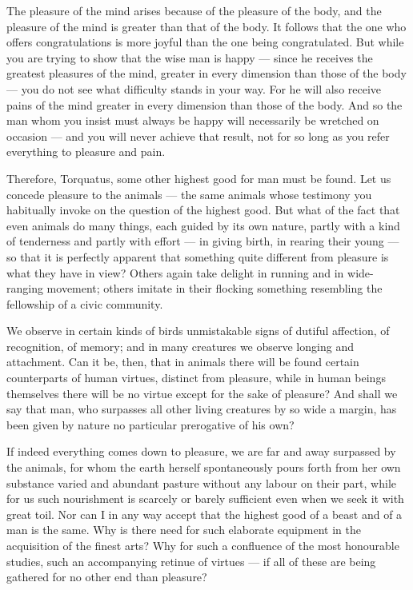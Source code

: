 The pleasure of the mind arises because of the pleasure of the body, and the pleasure of the mind is greater than that of the body. It follows that the one who offers congratulations is more joyful than the one being congratulated. But while you are trying to show that the wise man is happy — since he receives the greatest pleasures of the mind, greater in every dimension than those of the body — you do not see what difficulty stands in your way. For he will also receive pains of the mind greater in every dimension than those of the body. And so the man whom you insist must always be happy will necessarily be wretched on occasion — and you will never achieve that result, not for so long as you refer everything to pleasure and pain.

Therefore, Torquatus, some other highest good for man must be found. Let us concede pleasure to the animals — the same animals whose testimony you habitually invoke on the question of the highest good. But what of the fact that even animals do many things, each guided by its own nature, partly with a kind of tenderness and partly with effort — in giving birth, in rearing their young — so that it is perfectly apparent that something quite different from pleasure is what they have in view? Others again take delight in running and in wide-ranging movement; others imitate in their flocking something resembling the fellowship of a civic community.

We observe in certain kinds of birds unmistakable signs of dutiful affection, of recognition, of memory; and in many creatures we observe longing and attachment. Can it be, then, that in animals there will be found certain counterparts of human virtues, distinct from pleasure, while in human beings themselves there will be no virtue except for the sake of pleasure? And shall we say that man, who surpasses all other living creatures by so wide a margin, has been given by nature no particular prerogative of his own?

If indeed everything comes down to pleasure, we are far and away surpassed by the animals, for whom the earth herself spontaneously pours forth from her own substance varied and abundant pasture without any labour on their part, while for us such nourishment is scarcely or barely sufficient even when we seek it with great toil. Nor can I in any way accept that the highest good of a beast and of a man is the same. Why is there need for such elaborate equipment in the acquisition of the finest arts? Why for such a confluence of the most honourable studies, such an accompanying retinue of virtues — if all of these are being gathered for no other end than pleasure?

